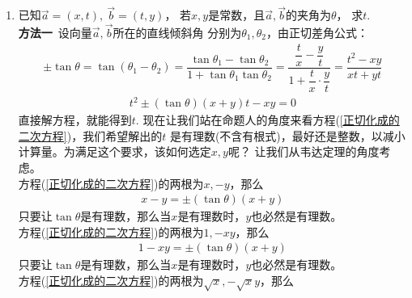 \begin{enumerate}[label={【\textbf{例\thechapter.\arabic*}】},
 leftmargin=\inteval{\myenumleftmargin}pt,
 itemsep=\inteval{\myenumitempsep}pt,
 itemindent=\inteval{\myenumitemindent}pt]
\begin{gather*}
    \dfrac{S_{\Delta PQR}}{S_ {\Delta ABC}} =\dfrac{|BD|}{|BC|}\cdot
    \dfrac{|PR|}{|AD|} \cdot \dfrac{|PQ|}{|PB|}=\dfrac{n-1}{n}
    \cdot(k_2-k_1)\cdot\dfrac{k_2-k_1}{k_2}=\dfrac{(n-2)^2}{n^2-n+1}
\end{gather*}
如果$ n=2 $，那么$ S_{\Delta PQR} =0 $，这正是三条中线交于一点的表现。\\
\textbf{注2}\ 更一般地，若$ \dfrac{|AF|}{|FB|}=\lambda_1,\ 
\dfrac{|BD|}{|DC|}=\lambda_2,\ \dfrac{|CE|}{|EA|}=\lambda_3 $，那么
\begin{align*}
    \dfrac{S_{\Delta PQR}}{S_ {\Delta ABC}} =\dfrac{(\lambda_1\lambda_2
        \lambda_3-1)^2}{(1+\lambda_1+\lambda_1\lambda_2)
        (1+\lambda_2+\lambda_2\lambda_3)(1+\lambda_3+\lambda_3\lambda_1)}
\end{align*}

\item 已知$ \vec{a}=(x,t),\ \vec{b}=(t,y) $，
若$ x,y $是常数，且$ \vec{a},\vec{b} $的夹角为$ \theta $，
求$ t $. \\
\textbf{方法一}\ 设向量$ \vec{a},\vec{b} $所在的直线倾斜角
分别为$ \theta_1,\theta_2 $，由正切差角公式：
\begin{gather*}
    \pm\tan\theta=\tan(\theta_1-\theta_2)=\dfrac{\tan\theta_1-\tan\theta_2}
    {1+\tan\theta_1	\tan\theta_2}=\dfrac{\dfrac{t}{x}-\dfrac{y}{t}}{1+
        \dfrac{t}{x}\cdot\dfrac{y}{t}}=\dfrac{t^2-xy}{xt+yt} 
\end{gather*}
\begin{gather}\label{正切化成的二次方程}
    t^2\pm(\tan\theta)(x+y)t-xy=0
\end{gather}
直接解方程，就能得到$ t $. 
现在让我们站在命题人的角度来看方程(\ref{正切化成的二次方程})，我们希望解出的$ t $
是有理数(不含有根式)，最好还是整数，以减小计算量。为满足这个要求，该如何选定$ x,y $呢？
让我们从韦达定理的角度考虑。\\
 方程(\ref{正切化成的二次方程})的两根为$ x,-y $，那么
\begin{gather}\label{考虑有理数-情形1}
    x-y=\pm(\tan\theta)(x+y)
\end{gather}
只要让$ \tan\theta $是有理数，那么当$ x $是有理数时，$ y $也必然是有理数。\\
 方程(\ref{正切化成的二次方程})的两根为$ 1,-xy $，那么
\begin{gather}\label{考虑有理数-情形2}
    1-xy=\pm(\tan\theta)(x+y)
\end{gather}
只要让$ \tan\theta $是有理数，那么当$ x $是有理数时，$ y $也必然是有理数。\\
 方程(\ref{正切化成的二次方程})的两根为$ \sqrt{x},-\sqrt{x}y $，那么

\end{enumerate}

